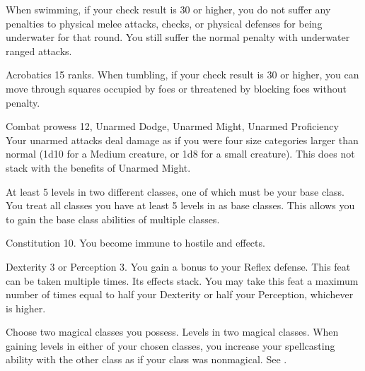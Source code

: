 When swimming, if your check result is 30 or higher, you do not suffer any penalties to physical melee attacks, checks, or physical defenses for being underwater for that round.
You still suffer the normal penalty with underwater ranged attacks.

\featpre Acrobatics 15 ranks.
\featben When tumbling, if your check result is 30 or higher, you can move through squares occupied by foes or threatened by blocking foes without penalty.

\featpres Combat prowess 12, Unarmed Dodge, Unarmed Might, Unarmed Proficiency
\featben Your unarmed attacks deal damage as if you were four size categories larger than normal (1d10 for a Medium creature, or 1d8 for a small creature).
This does not stack with the benefits of Unarmed Might.

\featpres At least 5 levels in two different classes, one of which must be your base class.
\featben You treat all classes you have at least 5 levels in as base classes.
This allows you to gain the base class abilities of multiple classes.

\featpre Constitution 10.
\featben You become immune to hostile  and  effects.

\featpre Dexterity 3 or Perception 3.
\featben You gain a  bonus to your Reflex defense.
 This feat can be taken multiple times. Its effects stack.
You may take this feat a maximum number of times equal to half your Dexterity or half your Perception, whichever is higher.

Choose two magical classes you possess.
\featpres
Levels in two magical classes.
\featben When gaining levels in either of your chosen classes, you increase your spellcasting ability with the other class as if your class was nonmagical.
See .

